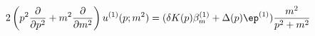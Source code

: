\begin{equation}
2 \left( p^2 \frac{\partial}{\partial p^2} + m^2
\frac{\partial}{\partial m^2} \right) u^{(1)} (p; m^2) = (\delta K(p)
\beta_m^{(1)}  + \Delta (p) \ep^{(1)} ) \frac{m^2}{p^2 + m^2}
\end{equation}

